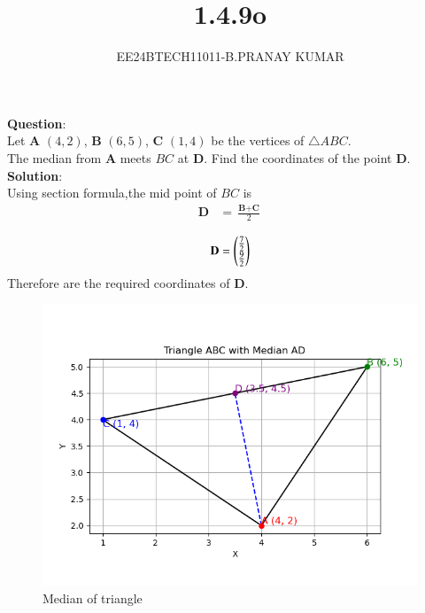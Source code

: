 \documentclass[journal]{IEEEtran}
\begin{document}

\vspace{3cm}

\title{1.4.9o}
\author{EE24BTECH11011-B.PRANAY KUMAR
}
 \maketitle
{\let\newpage\relax\maketitle}

\renewcommand{\thefigure}{\theenumi}
\renewcommand{\thetable}{\theenumi}
\setlength{\intextsep}{10pt} %


\renewcommand{\thetable}{\theenumi}




\textbf{Question}:\\
Let \textbf{A} $(4,2)$, \textbf{B} $(6,5)$, \textbf{C} $(1,4)$ be the vertices of \(\triangle ABC\). \\
The median from \textbf{A} meets \(BC\) at \textbf{D}. Find the coordinates of the point \textbf{D}.\\
\textbf{Solution}:\\
Using section formula,the mid point of $BC$ is
\begin{align}
\textbf{D} &= \frac{\textbf{B} + \textbf{C}}{2}\\
\end{align}
\begin{align}
    \textbf{D} = \begin{pmatrix}{\frac{7}{2}}\\{\frac{9}{2}}\end{pmatrix}
\end{align}
Therefore  are the required coordinates of \textbf{D}.
\begin{figure}[h!]
   \centering
   \includegraphics[width=0.7\linewidth]{figs/Figure_1.png}
   \caption{Median of triangle}
\end{figure}
\end{document}
